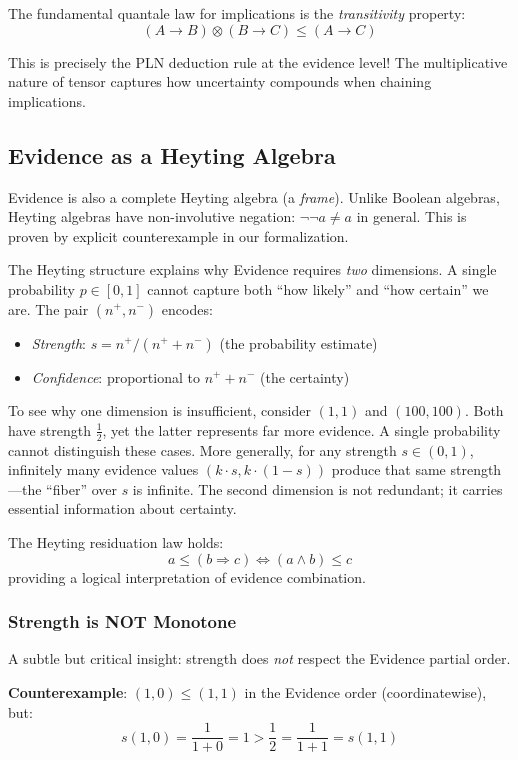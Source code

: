 \documentclass[]{article}
\begin{document}
The fundamental quantale law for implications is the \emph{transitivity} property:
$$(A \to B) \otimes (B \to C) \leq (A \to C)$$

This is precisely the PLN deduction rule at the evidence level!  The multiplicative
nature of tensor captures how uncertainty compounds when chaining implications.

\subsection{Evidence as a Heyting Algebra}

Evidence is also a complete Heyting algebra (a \emph{frame}).  Unlike Boolean
algebras, Heyting algebras have non-involutive negation: $\neg\neg a \neq a$
in general.  This is proven by explicit counterexample in our formalization.

The Heyting structure explains why Evidence requires \emph{two} dimensions.
A single probability $p \in [0,1]$ cannot capture both ``how likely'' and
``how certain'' we are.  The pair $(n^+, n^-)$ encodes:
\begin{itemize}
\item \emph{Strength}: $s = n^+ / (n^+ + n^-)$ (the probability estimate)
\item \emph{Confidence}: proportional to $n^+ + n^-$ (the certainty)
\end{itemize}

To see why one dimension is insufficient, consider $(1, 1)$ and $(100, 100)$.
Both have strength $\frac{1}{2}$, yet the latter represents far more evidence.
A single probability cannot distinguish these cases.  More generally, for any
strength $s \in (0,1)$, infinitely many evidence values $(k \cdot s, k \cdot (1-s))$
produce that same strength---the ``fiber'' over $s$ is infinite.  The second
dimension is not redundant; it carries essential information about certainty.

The Heyting residuation law holds:
$$a \leq (b \Rightarrow c) \iff (a \wedge b) \leq c$$
providing a logical interpretation of evidence combination.

\subsubsection{Strength is NOT Monotone}
A subtle but critical insight: strength does \emph{not} respect the
Evidence partial order.

\textbf{Counterexample}: $(1, 0) \leq (1, 1)$ in the Evidence order
(coordinatewise), but:
$$s(1, 0) = \frac{1}{1+0} = 1 > \frac{1}{2} = \frac{1}{1+1} = s(1, 1)$$
\end{document}
